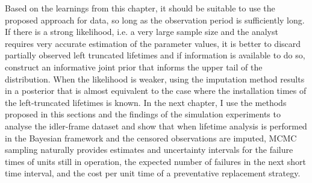 Based on the learnings from this chapter, it should be suitable to use the proposed approach for data, so long as the observation period is sufficiently long. If there is a strong likelihood, i.e. a very large sample size and the analyst requires very accurate estimation of the parameter values, it is better to discard partially observed left truncated lifetimes and if information is available to do so, construct an informative joint prior that informs the upper tail of the distribution. When the likelihood is weaker, using the imputation method results in a posterior that is almost equivalent to the case where the installation times of the left-truncated lifetimes is known. In the next chapter, I use the methods proposed in this sections and the findings of the simulation experiments to analyse the idler-frame dataset and show that when lifetime analysis is performed in the Bayesian framework and the censored observations are imputed, MCMC sampling naturally provides estimates and uncertainty intervals for the failure times of units still in operation, the expected number of failures in the next short time interval, and the cost per unit time of a preventative replacement strategy.
